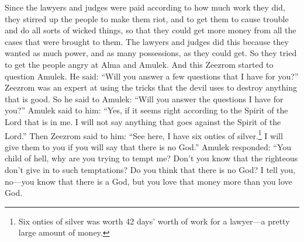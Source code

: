 Since the lawyers and judges were paid according to how much work they did, they stirred up the people to make them riot, and to get them to cause trouble and do all sorts of wicked things, so that they could get more money from all the cases that were brought to them. The lawyers and judges did this because they wanted as much power, and as many possessions, as they could get. So they tried to get the people angry at Alma and Amulek.
\bverse \iffalse And this Zeezrom began to question Amulek, saying: Will ye answer me a few questions which I shall ask you? Now Zeezrom was a man who was expert in the devices of the devil, that he might destroy that which was good; therefore, he said unto Amulek: Will ye answer the questions which I shall put unto you? \fi
And this Zeezrom started to question Amulek. He said: ``Will you answer a few questions that I have for you?'' Zeezrom was an expert at using the tricks that the devil uses to destroy anything that is good. So he said to Amulek: ``Will you answer the questions I have for you?''
\bverse \iffalse And Amulek said unto him: Yea, if it be according to the Spirit of the Lord, which is in me; for I shall say nothing which is contrary to the Spirit of the Lord. And Zeezrom said unto him: Behold, here are six onties of silver, and all these will I give thee if thou wilt deny the existence of a Supreme Being. \fi
Amulek said to him: ``Yes, if it seems right according to the Spirit of the Lord that is in me. I will not say anything that goes against the Spirit of the Lord.'' Then Zeezrom said to him: ``See here, I have six onties of silver.\footnote{Six onties of silver was worth 42 days' worth of work for a lawyer---a pretty large amount of money.} I will give them to you if you will say that there is no God.''
\bverse \iffalse Now Amulek said: O thou child of hell, why tempt ye me?  Knowest thou that the righteous yieldeth to no such temptations? \fi
Amulek responded: ``You child of hell, why are you trying to tempt me? Don't you know that the righteous don't give in to such temptations?
\bverse \iffalse Believest thou that there is no God? I say unto you, Nay, thou knowest that there is a God, but thou lovest that lucre more than him. \fi
Do you think that there is no God? I tell you, no---you know that there is a God, but you love that money more than you love God.
\bverse \iffalse And now thou hast lied before God unto me. Thou saidst unto me--Behold these six onties, which are of great worth, I will give unto thee--when thou hadst it in thy heart to retain them from me; and it was only thy desire that I should deny the true and living God, that thou mightest have cause to destroy me. And now behold, for this great evil thou shalt have thy reward. \fi
